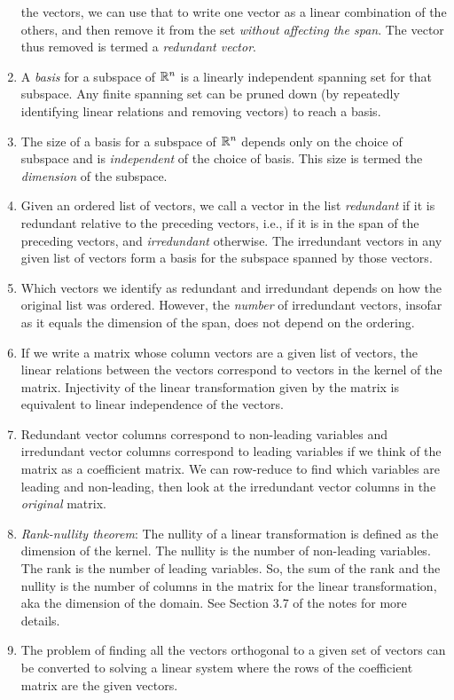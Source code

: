 \documentclass[10pt]{amsart}
\begin{document}
\begin{enumerate}
  the vectors, we can use that to write one vector as a linear
  combination of the others, and then remove it from the set {\em
    without affecting the span}. The vector thus removed is termed a
  {\em redundant vector}.
\item A {\em basis} for a subspace of $\mathbb{R}^n$ is a linearly independent
  spanning set for that subspace. Any finite spanning set can be
  pruned down (by repeatedly identifying linear relations and removing
  vectors) to reach a basis.
\item The size of a basis for a subspace of $\mathbb{R}^n$ depends only on the
  choice of subspace and is {\em independent} of the choice of
  basis. This size is termed the {\em dimension} of the subspace.
\item Given an ordered list of vectors, we call a vector in the list
  {\em redundant} if it is redundant relative to the preceding
  vectors, i.e., if it is in the span of the preceding vectors, and
  {\em irredundant} otherwise. The irredundant vectors in any given
  list of vectors form a basis for the subspace spanned by those
  vectors.
\item Which vectors we identify as redundant and irredundant depends
  on how the original list was ordered. However, the {\em number} of
  irredundant vectors, insofar as it equals the dimension of the span,
  does not depend on the ordering.
\item If we write a matrix whose column vectors are a given list of
  vectors, the linear relations between the vectors correspond to
  vectors in the kernel of the matrix. Injectivity of the linear
  transformation given by the matrix is equivalent to linear
  independence of the vectors.
\item Redundant vector columns correspond to non-leading variables and
  irredundant vector columns correspond to leading variables if we
  think of the matrix as a coefficient matrix. We can row-reduce to
  find which variables are leading and non-leading, then look at the
  irredundant vector columns in the {\em original} matrix.
\item {\em Rank-nullity theorem}: The nullity of a linear transformation
  is defined as the dimension of the kernel. The nullity is the number
  of non-leading variables. The rank is the number of leading
  variables. So, the sum of the rank and the nullity is the number of
  columns in the matrix for the linear transformation, aka the
  dimension of the domain. See Section 3.7 of the notes for more details.
\item The problem of finding all the vectors orthogonal to a given set
  of vectors can be converted to solving a linear system where the
  rows of the coefficient matrix are the given vectors.
\end{enumerate}
\end{document}
